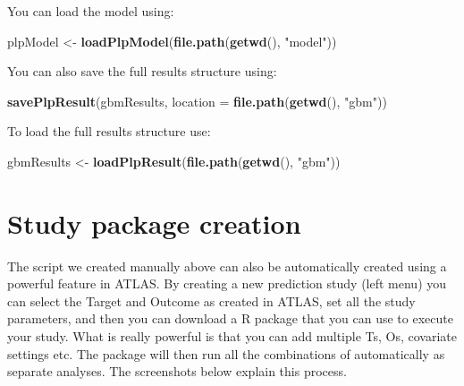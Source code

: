 \documentclass[
]{article}
\newenvironment{Shaded}{\begin{snugshade}}{\end{snugshade}}
\newcommand{\DataTypeTok}[1]{\textcolor[rgb]{0.13,0.29,0.53}{#1}}
\newcommand{\KeywordTok}[1]{\textcolor[rgb]{0.13,0.29,0.53}{\textbf{#1}}}
\newcommand{\NormalTok}[1]{#1}
\newcommand{\StringTok}[1]{\textcolor[rgb]{0.31,0.60,0.02}{#1}}
\begin{document}
You can load the model using:

\begin{Shaded}
\begin{Highlighting}[]
\NormalTok{plpModel <-}\StringTok{ }\KeywordTok{loadPlpModel}\NormalTok{(}\KeywordTok{file.path}\NormalTok{(}\KeywordTok{getwd}\NormalTok{(), }\StringTok{"model"}\NormalTok{))}
\end{Highlighting}
\end{Shaded}

You can also save the full results structure using:

\begin{Shaded}
\begin{Highlighting}[]
\KeywordTok{savePlpResult}\NormalTok{(gbmResults, }\DataTypeTok{location =} \KeywordTok{file.path}\NormalTok{(}\KeywordTok{getwd}\NormalTok{(), }\StringTok{"gbm"}\NormalTok{))}
\end{Highlighting}
\end{Shaded}

To load the full results structure use:

\begin{Shaded}
\begin{Highlighting}[]
\NormalTok{gbmResults <-}\StringTok{ }\KeywordTok{loadPlpResult}\NormalTok{(}\KeywordTok{file.path}\NormalTok{(}\KeywordTok{getwd}\NormalTok{(), }\StringTok{"gbm"}\NormalTok{))}
\end{Highlighting}
\end{Shaded}

\newpage

\hypertarget{study-package-creation}{%
\section{Study package creation}\label{study-package-creation}}

The script we created manually above can also be automatically created
using a powerful feature in ATLAS. By creating a new prediction study
(left menu) you can select the Target and Outcome as created in ATLAS,
set all the study parameters, and then you can download a R package that
you can use to execute your study. What is really powerful is that you
can add multiple Ts, Os, covariate settings etc. The package will then
run all the combinations of automatically as separate analyses. The
screenshots below explain this process.
\end{document}
